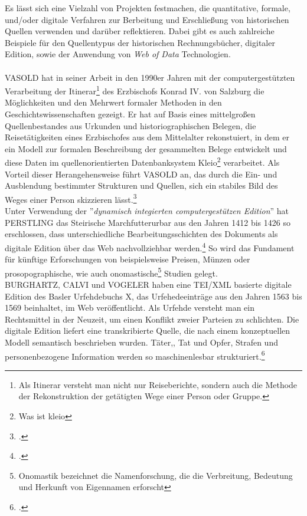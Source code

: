 \documentclass[12pt,a4paper]{article}
\begin{document}
Es lässt sich eine Vielzahl von Projekten festmachen, die quantitative, formale, und/oder digitale Verfahren zur Berbeitung und Erschließung von historischen Quellen verwenden und darüber reflektieren. Dabei gibt es auch zahlreiche Beispiele für den Quellentypus der historischen Rechnungsbücher, digitaler Edition, sowie der Anwendung von \textit{Web of Data} Technologien.
\\
\\
VASOLD hat in seiner Arbeit in den 1990er Jahren mit der computergestützten Verarbeitung der Itinerar\footnote{Als Itinerar versteht man nicht nur Reiseberichte, sondern auch die Methode der Rekonstruktion der getätigten Wege einer Person oder Gruppe.} des Erzbischofs Konrad IV. von Salzburg die Möglichkeiten und den Mehrwert formaler Methoden in den Geschichtswissenschaften gezeigt. Er hat auf Basis eines mittelgroßen Quellenbestandes aus Urkunden und historiographischen Belegen, die Reisetätigkeiten eines Erzbischofes aus dem Mittelalter rekonstuiert, in dem er ein Modell zur formalen Beschreibung der gesammelten Belege entwickelt und diese Daten im quellenorientierten Datenbanksystem Kleio\footnote{Was ist kleio} verarbeitet. Als Vorteil dieser Herangehensweise führt VASOLD an, das durch die Ein- und Ausblendung bestimmter Strukturen und Quellen, sich ein stabiles Bild des Weges einer Person skizzieren lässt.\footcite{vasold1996itinerar}
\\
Unter Verwendung der ''\textit{dynamisch integierten computergestützen Edition}'' hat PERSTLING das Steirische Marchfutterurbar aus den Jahren 1412 bis 1426 so erschlossen, dass unterschiedliche Bearbeitungsschichten des Dokuments als digitale Edition über das Web nachvollziehbar werden.\footcite{PerstlingMatthias2013MDuE} So wird das Fundament für künftige  Erforschungen von beispielsweise Preisen, Münzen oder prosopographische, wie  auch onomastische\footnote{Onomastik bezeichnet die Namenforschung, die die Verbreitung, Bedeutung und Herkunft von Eigennamen erforscht} Studien gelegt.
\\
BURGHARTZ, CALVI und VOGELER haben eine TEI/XML basierte digitale Edition des Basler Urfehdebuchs X, das Urfehedeeinträge aus den Jahren 1563 bis 1569 beinhaltet, im Web veröffentlicht. Als Urfehde versteht man ein Rechtsmittel in der Neuzeit, um einen Konflikt zweier Parteien zu schlichten. Die digitale Edition liefert eine transkribierte Quelle, die nach einem konzeptuellen Modell semantisch beschrieben wurden. Täter,, Tat und Opfer, Strafen und personenbezogene Information werden so maschinenlesbar strukturiert.\footcite[][S.27-29]{pollin2017semantically} 
\end{document}
